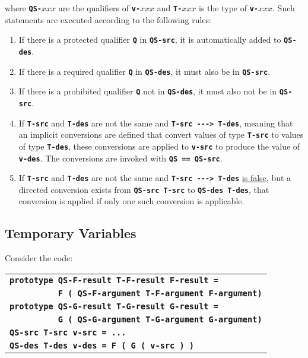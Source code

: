 \documentclass[12pt]{article}
\newcommand{\TT}[1]{{\tt \bfseries #1}}
\begin{document}
where \TT{QS-}$xxx$ are the qualifiers of \TT{v-}$xxx$ and
\TT{T-}$xxx$ is the type of \TT{v-}$xxx$.  Such statements are
executed according to the following rules:

\begin{enumerate}
\item If there is a protected qualifier \TT{Q} in \TT{QS-src}, it
is automatically added to \TT{QS-des}.
\item If there is a required qualifier \TT{Q} in \TT{QS-des}, it
must also be in \TT{QS-src}.
\item If there is a prohibited qualifier \TT{Q} not in \TT{QS-des}, it
must also not be in \TT{QS-src}.
\item If \TT{T-src} and \TT{T-des} are not the same
and \TT{T-src~-{}-{}->~T-des},
meaning that an implicit conversions are defined that convert values
of type \TT{T-src} to values of type \TT{T-des}, these conversions are
applied to \TT{v-src} to produce the value of \TT{v-des}.
The conversions are invoked with \TT{QS == QS-src}.
\item
\label{DIRECT-CONVERSION-ASSIGMENTS}
If \TT{T-src} and \TT{T-des} are not the same and \TT{T-src~-{}-{}->~T-des}
\underline{is false}, but a directed conversion exists from
\TT{QS-src T-src} to \TT{QS-des T-des}, that conversion is applied
if only one such conversion is applicable.
\end{enumerate}


\subsection{Temporary Variables}
\label{TEMPORARY-VARIABLES}

Consider the code:

\begin{center}
\begin{tabular}{l}
\TT{prototype QS-F-result T-F-result F-result =} \\
\TT{~~~~~~~~~~F ( QS-F-argument T-F-argument F-argument)} \\
\TT{prototype QS-G-result T-G-result G-result =} \\
\TT{~~~~~~~~~~G ( QS-G-argument T-G-argument G-argument)} \\
\TT{QS-src T-src v-src = ...} \\
\TT{QS-des T-des v-des = F ( G ( v-src ) )} \\
\end{tabular}
\end{center}
\end{document}
